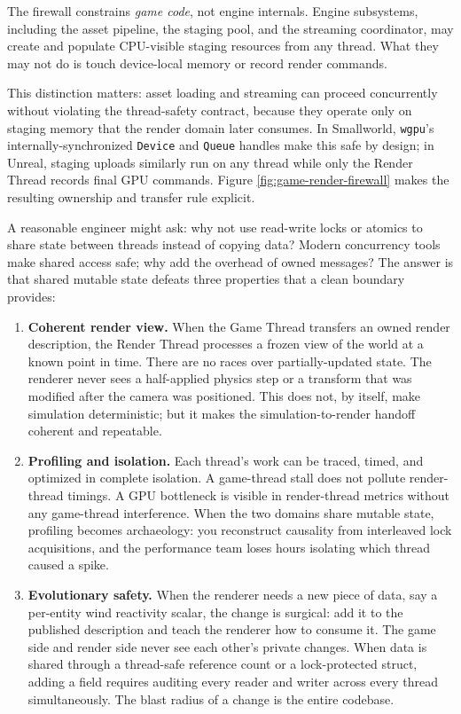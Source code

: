 \documentclass[
  11pt,
  letterpaper,
  DIV=11,
  numbers=noendperiod,
  twoside,
  open=right]{scrreprt}
\begin{document}
The firewall constrains \emph{game code}, not engine internals. Engine
subsystems, including the asset pipeline, the staging pool, and the
streaming coordinator, may create and populate CPU-visible staging
resources from any thread. What they may not do is touch device-local
memory or record render commands.

This distinction matters: asset loading and streaming can proceed
concurrently without violating the thread-safety contract, because they
operate only on staging memory that the render domain later consumes. In
Smallworld, \texttt{wgpu}'s internally-synchronized \texttt{Device} and
\texttt{Queue} handles make this safe by design; in Unreal, staging
uploads similarly run on any thread while only the Render Thread records
final GPU commands. Figure \ref{fig:game-render-firewall} makes the
resulting ownership and transfer rule explicit.



A reasonable engineer might ask: why not use read-write locks or atomics
to share state between threads instead of copying data? Modern
concurrency tools make shared access safe; why add the overhead of owned
messages? The answer is that shared mutable state defeats three
properties that a clean boundary provides:

\begin{enumerate}
\def\labelenumi{\arabic{enumi}.}
\item
  \textbf{Coherent render view.} When the Game Thread transfers an owned
  render description, the Render Thread processes a frozen view of the
  world at a known point in time. There are no races over
  partially-updated state. The renderer never sees a half-applied
  physics step or a transform that was modified after the camera was
  positioned. This does not, by itself, make simulation deterministic;
  but it makes the simulation-to-render handoff coherent and repeatable.
\item
  \textbf{Profiling and isolation.} Each thread's work can be traced,
  timed, and optimized in complete isolation. A game-thread stall does
  not pollute render-thread timings. A GPU bottleneck is visible in
  render-thread metrics without any game-thread interference. When the
  two domains share mutable state, profiling becomes archaeology: you
  reconstruct causality from interleaved lock acquisitions, and the
  performance team loses hours isolating which thread caused a spike.
\item
  \textbf{Evolutionary safety.} When the renderer needs a new piece of
  data, say a per-entity wind reactivity scalar, the change is surgical:
  add it to the published description and teach the renderer how to
  consume it. The game side and render side never see each other's
  private changes. When data is shared through a thread-safe reference
  count or a lock-protected struct, adding a field requires auditing
  every reader and writer across every thread simultaneously. The blast
  radius of a change is the entire codebase.
\end{enumerate}
\end{document}
